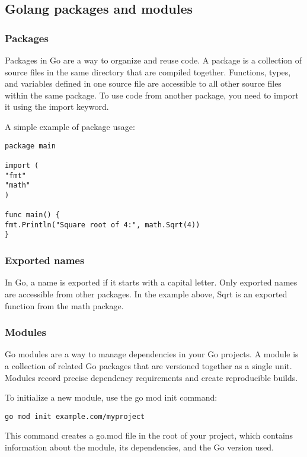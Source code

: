 \documentclass{article}
\begin{document}
\subsection{Golang packages and modules}

\subsubsection{Packages}

Packages in Go are a way to organize and reuse code. A package is a collection of source files in the same directory that are compiled together. Functions, types, and variables defined in one source file are accessible to all other source files within the same package. To use code from another package, you need to import it using the import keyword.

A simple example of package usage:

\begin{verbatim}
package main

import (
"fmt"
"math"
)

func main() {
fmt.Println("Square root of 4:", math.Sqrt(4))
}
\end{verbatim}

\subsubsection{Exported names}

In Go, a name is exported if it starts with a capital letter. Only exported names are accessible from other packages. In the example above, Sqrt is an exported function from the math package.

\subsubsection{Modules}

Go modules are a way to manage dependencies in your Go projects. A module is a collection of related Go packages that are versioned together as a single unit. Modules record precise dependency requirements and create reproducible builds.

To initialize a new module, use the go mod init command:

\begin{verbatim}
go mod init example.com/myproject
\end{verbatim}

This command creates a go.mod file in the root of your project, which contains information about the module, its dependencies, and the Go version used.
\end{document}
